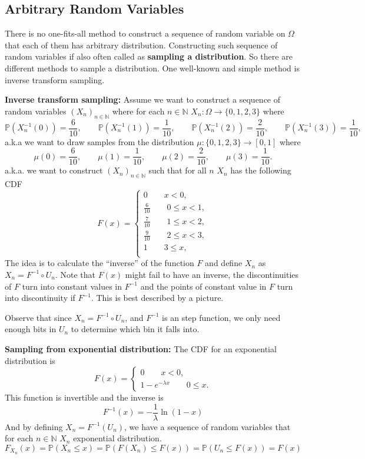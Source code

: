 \documentclass[11pt,a4paper]{article}
\theoremstyle{definition}
\theoremstyle{Example}
\newcommand{\PP}{\mathbb{P}}
\newcommand{\set}[1]{\{#1\}}
\newcommand{\N}{\mathbb{N}}
\begin{document}
	
	\subsection{Arbitrary Random Variables}
	There is no one-fits-all method to construct a sequence of random variable on $ \Omega $ that each of them has arbitrary distribution. Constructing such sequence of random variables if also often called as \textbf{sampling a distribution}. So there are different methods to sample a distribution. One well-known and simple method is inverse transform sampling.
	
	
	\textbf{Inverse transform sampling:} Assume we want to construct a sequence of  random variables $ (X_n)_{n\in\N} $ where for each $ n\in \N $ $ X_n:\Omega \to \set{0,1,2,3} $ where
	\[ \PP(X_n^{-1}(0)) = \frac{6}{10}, \qquad \PP(X_n^{-1}(1)) = \frac{1}{10},\qquad \PP(X_n^{-1}(2)) = \frac{2}{10},\qquad \PP(X_n^{-1}(3)) = \frac{1}{10}, \]
	a.k.a we want to draw samples from the distribution $ \mu:\set{0,1,2,3}\to[0,1] $ where
	\[ \mu(0) = \frac{6}{10}, \qquad \mu(1) = \frac{1}{10}, \qquad \mu(2)=\frac{2}{10}, \qquad \mu(3) = \frac{1}{10}. \]
	a.k.a. we want to construct $ (X_n)_{n\in\N} $ such that for all $ n $ $ X_n $ has the following CDF
	\[ F(x) = \begin{cases}
		0 \qquad x<0,\\
		\frac{6}{10} \qquad 0\leq x < 1,\\
		\frac{7}{10} \qquad 1\leq x < 2,\\
		\frac{9}{10} \qquad 2\leq x < 3,\\
		1 \qquad 3\leq x,\\
	\end{cases} \]
	The idea is to calculate the ``inverse'' of the function $ F $ and define $ X_n $ as $ X_n = F^{-1} \circ U_n $. Note that $ F(x) $ might fail to have an inverse, the discontinuities of $ F $ turn into constant values in $ F^{-1} $ and the points of constant value in $ F $ turn into discontinuity if $ F^{-1} $. This is best described by a picture.
	
	Observe that since $ X_n = F^{-1}\circ U_n $, and $ F^{-1} $ is an step function, we only need enough bits in $ U_n $ to determine which bin it falls into.
	\FloatBarrier
	
	
	\textbf{Sampling from exponential distribution:} The CDF for an exponential distribution is 
	\[ F(x) = \begin{cases}
		0 \qquad  x< 0, \\
		1-e^{-\lambda x} \qquad 0\leq x.
	\end{cases} \]
	This function is invertible and the inverse is
	\[ F^{-1}(x) = -\frac{1}{\lambda}\ln(1-x) \]
	And by defining $ X_n = F^{-1}(U_n) $, we have a sequence of random variables that for each $ n\in\N $ $ X_n $ exponential distribution.
	\[ F_{X_n}(x) = \PP(X_n \leq x) = \PP(F(X_n) \leq F(x)) = \PP(U_n \leq F(x)) = F(x) \]
	
\end{document}
